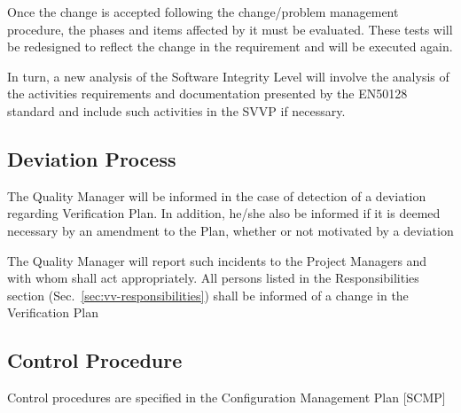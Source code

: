 Once the change is accepted following the change/problem management
procedure, the phases and items affected by it must be
evaluated. These tests will be redesigned to reflect the change in the
requirement and will be executed again. 

In turn, a new analysis of the Software Integrity Level will involve
the analysis of the activities requirements and documentation
presented by the EN50128 standard and include such activities in the
SVVP if necessary. 

\subsection{Deviation Process}
The Quality Manager will be informed in the case of detection of a
deviation regarding Verification Plan. In addition, he/she also be
informed if it is deemed necessary by an amendment to the Plan,
whether or not motivated by a deviation 

The Quality Manager will report such incidents to the Project Managers
and with whom shall act appropriately. All persons listed in the
Responsibilities section (Sec.~\ref{sec:vv-responsibilities}) shall be
informed of a change in the Verification Plan

\subsection{Control Procedure}
Control procedures are specified in the Configuration Management Plan [SCMP]
